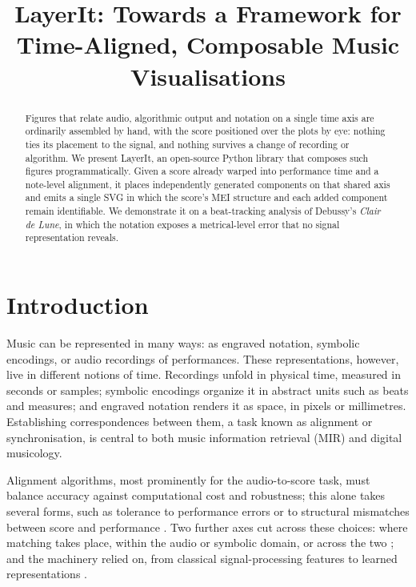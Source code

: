 \documentclass{article}
\title{LayerIt: \linebreak Towards a Framework for Time-Aligned, Composable Music Visualisations}
\begin{document}
%
\maketitle
%
\begin{abstract}
Figures that relate audio, algorithmic output and notation on a single time axis are ordinarily assembled by hand, with the score positioned over the plots by eye: nothing ties its placement to the signal, and nothing survives a change of recording or algorithm. We present LayerIt, an open-source Python library that composes such figures programmatically. Given a score already warped into performance time and a note-level alignment, it places independently generated components on that shared axis and emits a single SVG in which the score's MEI structure and each added component remain identifiable. We demonstrate it on a beat-tracking analysis of Debussy's \emph{Clair de Lune}, in which the notation exposes a metrical-level error that no signal representation reveals.
\end{abstract}
%
\section{Introduction}\label{sec:introduction}

Music can be represented in many ways: as engraved notation, symbolic encodings, or audio recordings of performances. These representations, however, live in different notions of time. Recordings unfold in physical time, measured in seconds or samples; symbolic encodings organize it in abstract units such as beats and measures; and engraved notation renders it as space, in pixels or millimetres. Establishing correspondences between them, a task known as alignment or synchronisation, is central to both music information retrieval (MIR) and digital musicology.

Alignment algorithms, most prominently for the audio-to-score task, must balance accuracy against computational cost and robustness\cite{muller2021SyncToolboxPython}; this alone takes several forms, such as tolerance to performance errors \cite{nakamura2017PerformanceErrorDetection} or to structural mismatches between score and performance \cite{fremerey2010HandlingRepeatsJumps}. Two further axes cut across these choices: where matching takes place, within the audio or symbolic domain, or across the two \cite{mueller2019CrossModalMusicRetrieval}; and the machinery relied on, from classical signal-processing features to learned representations \cite{zeitler2025RobustAccurateAudio}. 
\end{document}

